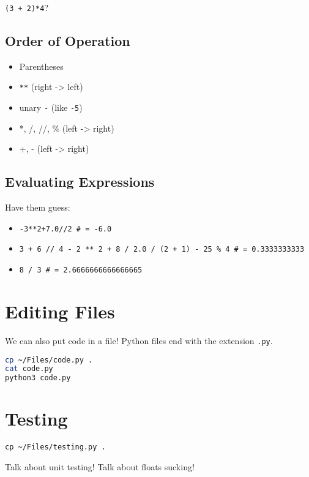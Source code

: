 \documentclass[12pt]{article}
\begin{document}
\noindent
\lstinline{(3 + 2)*4}?

\subsection{Order of Operation}

\begin{itemize}
   \item Parentheses
   \item \lstinline{**} (right -> left)
   \item unary \lstinline{-} (like \lstinline{-5})
   \item *, /, //, \% (left -> right)
   \item +, - (left -> right)
\end{itemize}

\subsection{Evaluating Expressions}

Have them guess:
\begin{itemize}
   \item \lstinline{-3**2+7.0//2 # = -6.0}
   \item \lstinline{3 + 6 // 4 - 2 ** 2 + 8 / 2.0 / (2 + 1) - 25 % 4 # = 0.3333333333}
   \item \lstinline{8 / 3 # = 2.6666666666666665}
\end{itemize}

\section{Editing Files}

We can also put code in a file!  Python files end with the extension
\lstinline{.py}.

\begin{lstlisting}[language=bash]
cp ~/Files/code.py .
cat code.py
python3 code.py
\end{lstlisting}

\section{Testing}

\begin{lstlisting}
cp ~/Files/testing.py .
\end{lstlisting}

\noindent
Talk about unit testing!  Talk about floats sucking!
\end{document}

